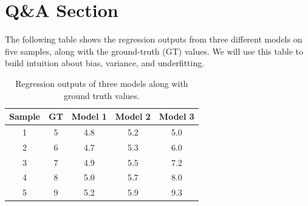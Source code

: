 \documentclass{article}
\begin{document}




\section{Q\&A Section}
The following table shows the regression outputs from three different models on five samples, along with the ground-truth (GT) values. We will use this table to build intuition about bias, variance, and underfitting.

\begin{table}[H]
    \centering
    \begin{tabular}{|c|c|c|c|c|}
        \hline
        Sample & GT & Model 1 & Model 2 & Model 3 \\ \hline
        1      & 5  & 4.8    & 5.2    & 5.0    \\ \hline
        2      & 6  & 4.7    & 5.3    & 6.0    \\ \hline
        3      & 7  & 4.9    & 5.5    & 7.2    \\ \hline
        4      & 8  & 5.0    & 5.7    & 8.0    \\ \hline
        5      & 9  & 5.2    & 5.9    & 9.3    \\ \hline
    \end{tabular}
    \caption{Regression outputs of three models along with ground truth values.}
\end{table}
\end{document}
